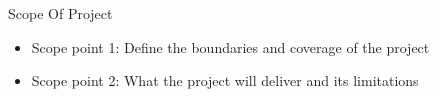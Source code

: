 
\begin{frame}{Scope Of Project}
    \begin{itemize}
        \item Scope point 1: Define the boundaries and coverage of the project
        \item Scope point 2: What the project will deliver and its limitations
    \end{itemize}
\end{frame}
